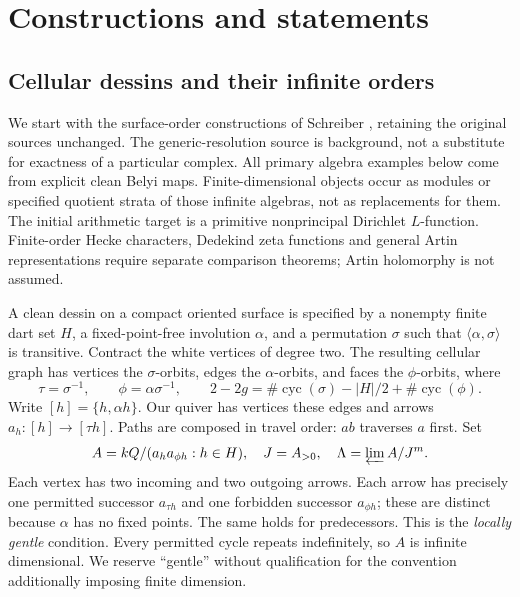 
\part{Constructions and statements}

\chapter{Cellular dessins and their infinite orders}
We start with the surface-order constructions of Schreiber \cite{SurfaceOrders,SurfaceDuality}, retaining the original sources unchanged. The generic-resolution source \cite{Persistence} is background, not a substitute for exactness of a particular complex. All primary algebra examples below come from explicit clean Belyi maps. Finite-dimensional objects occur as modules or specified quotient strata of those infinite algebras, not as replacements for them. The initial arithmetic target is a primitive nonprincipal Dirichlet $L$-function. Finite-order Hecke characters, Dedekind zeta functions and general Artin representations require separate comparison theorems; Artin holomorphy is not assumed.

A clean dessin on a compact oriented surface is specified by a nonempty finite dart set $H$, a fixed-point-free involution $\alpha$, and a permutation $\sigma$ such that $\langle\alpha,\sigma\rangle$ is transitive. Contract the white vertices of degree two. The resulting cellular graph has vertices the $\sigma$-orbits, edges the $\alpha$-orbits, and faces the $\phi$-orbits, where
\[
 \tau=\sigma^{-1},\qquad \phi=\alpha\sigma^{-1},\qquad
 2-2g=\#\operatorname{cyc}(\sigma)-|H|/2+\#\operatorname{cyc}(\phi).
\]
Write $[h]=\{h,\alpha h\}$. Our quiver has vertices these edges and arrows $a_h:[h]\to[\tau h]$. Paths are composed in travel order: $ab$ traverses $a$ first. Set
\[
 A=kQ/(a_h a_{\phi h}:h\in H),\quad J=A_{>0},\quad
 \Lambda=\varprojlim A/J^m.
\]
Each vertex has two incoming and two outgoing arrows. Each arrow has precisely one permitted successor $a_{\tau h}$ and one forbidden successor $a_{\phi h}$; these are distinct because $\alpha$ has no fixed points. The same holds for predecessors. This is the \emph{locally gentle} condition. Every permitted cycle repeats indefinitely, so $A$ is infinite dimensional. We reserve ``gentle'' without qualification for the convention additionally imposing finite dimension.

